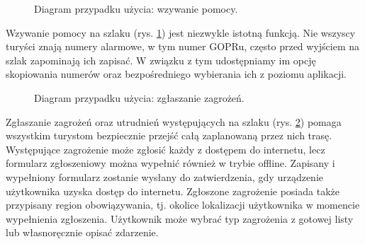     \setlength{\fboxrule}{0.5pt}
    \begin{figure}[H]
        \centering
        \caption{Diagram przypadku użycia: wzywanie pomocy.}
        \label{ucd:pomoc}
    \end{figure}
    Wzywanie pomocy na szlaku (rys. \ref{ucd:pomoc}) jest niezwykle istotną funkcją. Nie wszyscy turyści znają numery alarmowe, w tym numer GOPRu, często przed wyjściem na szlak zapominają ich zapisać. W związku z tym udostępniamy im opcję skopiowania numerów oraz bezpośredniego wybierania ich z poziomu aplikacji.

    \setlength{\fboxrule}{0.5pt}
    \begin{figure}[H]
        \centering
        \caption{Diagram przypadku użycia: zgłaszanie zagrożeń.}
        \label{ucd:zagrozenia}
    \end{figure}
    Zgłaszanie zagrożeń oraz utrudnień występujących na szlaku (rys. \ref{ucd:zagrozenia}) pomaga wszystkim turystom bezpiecznie przejść całą zaplanowaną przez nich trasę. Występujące zagrożenie może zgłosić każdy z dostępem do internetu, lecz formularz zgłoszeniowy można wypełnić również w trybie offline. Zapisany i wypełniony formularz zostanie wysłany do zatwierdzenia, gdy urządzenie użytkownika uzyska dostęp do internetu. Zgłoszone zagrożenie posiada także przypisany region obowiązywania, tj. okolice lokalizacji użytkownika w momencie wypełnienia zgłoszenia. Użytkownik może wybrać typ zagrożenia z gotowej listy lub własnoręcznie opisać zdarzenie.

